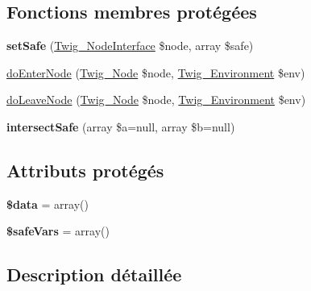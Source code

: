 \subsection*{Fonctions membres protégées}
\begin{DoxyCompactItemize}
\item 
{\bfseries set\+Safe} (\hyperlink{interface_twig___node_interface}{Twig\+\_\+\+Node\+Interface} \$node, array \$safe)\hypertarget{class_twig___node_visitor___safe_analysis_af25ab27e2dc14620ac5dce5447551964}{}\label{class_twig___node_visitor___safe_analysis_af25ab27e2dc14620ac5dce5447551964}

\item 
\hyperlink{class_twig___node_visitor___safe_analysis_a58d59325d3add0c1004f6a5cfb2562af}{do\+Enter\+Node} (\hyperlink{class_twig___node}{Twig\+\_\+\+Node} \$node, \hyperlink{class_twig___environment}{Twig\+\_\+\+Environment} \$env)
\item 
\hyperlink{class_twig___node_visitor___safe_analysis_a7e9db0312cbd70344096235921930dd2}{do\+Leave\+Node} (\hyperlink{class_twig___node}{Twig\+\_\+\+Node} \$node, \hyperlink{class_twig___environment}{Twig\+\_\+\+Environment} \$env)
\item 
{\bfseries intersect\+Safe} (array \$a=null, array \$b=null)\hypertarget{class_twig___node_visitor___safe_analysis_a0325567f89ef54756b27f5a4c4bbb969}{}\label{class_twig___node_visitor___safe_analysis_a0325567f89ef54756b27f5a4c4bbb969}

\end{DoxyCompactItemize}
\subsection*{Attributs protégés}
\begin{DoxyCompactItemize}
\item 
{\bfseries \$data} = array()\hypertarget{class_twig___node_visitor___safe_analysis_a6efc15b5a2314dd4b5aaa556a375c6d6}{}\label{class_twig___node_visitor___safe_analysis_a6efc15b5a2314dd4b5aaa556a375c6d6}

\item 
{\bfseries \$safe\+Vars} = array()\hypertarget{class_twig___node_visitor___safe_analysis_ac4491da07b27e3c0f9b37962428e567c}{}\label{class_twig___node_visitor___safe_analysis_ac4491da07b27e3c0f9b37962428e567c}

\end{DoxyCompactItemize}


\subsection{Description détaillée}


